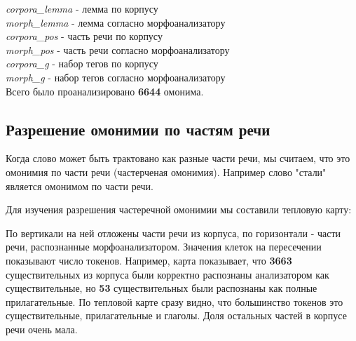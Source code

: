 \documentclass[a4paper,14pt]{article}
\begin{document}
	\begin{center}
    \end{center}
	
	\noindent
	\textit{corpora\_lemma} - лемма по корпусу \\
	\textit{morph\_lemma} - лемма согласно морфоанализатору \\
	\textit{corpora\_pos} - часть речи по корпусу \\
	\textit{morph\_pos} - часть речи согласно морфоанализатору \\
	\textit{corpora\_g} - набор тегов по корпусу \\
	\textit{morph\_g} - набор тегов согласно морфоанализатору \\
	\noindent
	Всего было проанализировано \textbf{6644} омонима.

	\subsection{Разрешение омонимии по частям речи}
	Когда слово может быть трактовано как разные части речи, мы считаем, что это омонимия по части речи (частерченая омонимия). Например слово "стали" является омонимом по части речи.

	Для изучения разрешения частеречной омонимии мы составили тепловую карту:
	\begin{center}
    \end{center}
	
	По вертикали на ней отложены части речи из корпуса, по горизонтали - части речи, распознанные морфоанализатором. Значения клеток на пересечении показывают число токенов. Например, карта показывает, что \textbf{3663} существительных из корпуса были корректно распознаны анализатором как существительные, но \textbf{53} существительных были распознаны как полные прилагательные.
	По тепловой карте сразу видно, что большинство токенов это существительные, прилагательные и глаголы. Доля остальных частей в корпусе речи очень мала.
\end{document}
